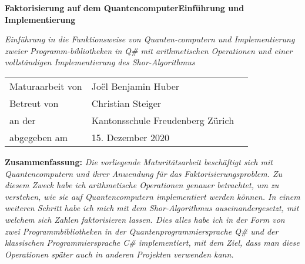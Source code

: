 \begin{titlepage}
    \centering
    {\begin{fullwidth}[leftmargin=-2cm, rightmargin=-2cm, width=\linewidth+4cm]
        \centering
        \huge \hspace{1cm} \textbf{Faktorisierung auf dem Quantencomputer\newline Einführung und Implementierung}
    \end{fullwidth}}
    \vspace{1cm}
    \begin{minipage}[c]{01\textwidth}
    {\LARGE\textit{Einführung in die Funktionsweise von Quanten-computern und Implementierung zweier Programm-bibliotheken in Q\# mit arithmetischen Operationen und einer vollständigen Implementierung des Shor-Algorithmus}}
    \end{minipage}
    \vspace{1cm}
    \newline
    {\Large \begin{tabular}{l@{}ll}
        Maturaarbeit von \; \; &  Joël Benjamin Huber & \\
        Betreut von & Christian Steiger & \\
        an der & Kantonsschule Freudenberg Zürich & \\
        abgegeben am & 15. Dezember 2020 & \\
    \end{tabular}
    }
    \vspace{3cm}
    \newline
    \begin{minipage}[c]{1\textwidth}
    {
        \textbf{Zusammenfassung: } \textit{Die vorliegende Maturitätsarbeit beschäftigt sich mit Quantencomputern und ihrer Anwendung für das Faktorisierungsproblem. Zu diesem Zweck habe ich arithmetische Operationen genauer betrachtet, um zu verstehen, wie sie auf Quantencomputern implementiert werden können. In einem weiteren Schritt habe ich mich mit dem Shor-Algorithmus auseinandergesetzt, mit welchem sich Zahlen faktorisieren lassen. Dies alles habe ich in der Form von zwei Programmbibliotheken in der Quantenprogrammiersprache Q\# und der klassischen Programmiersprache C\# implementiert, mit dem Ziel, dass man diese Operationen später auch in anderen Projekten verwenden kann. }
    }
    \end{minipage}
\end{titlepage}